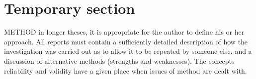 \section{Temporary section}
METHOD in longer theses, it is appropriate for the author to define his or her approach. All
reports must contain a sufficiently detailed description of how the investigation was carried
out as to allow it to be repeated by someone else. and a discussion of alternative methods
(strengths and weaknesses). The concepts reliability and validity have a given place when
issues of method are dealt with.

